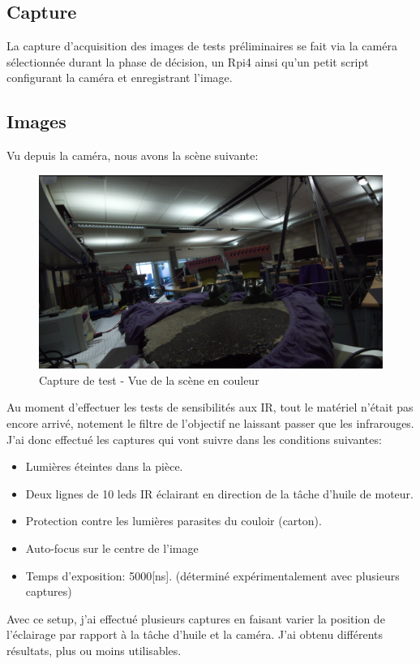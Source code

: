 \subsection{Capture}
La capture d'acquisition des images de tests préliminaires se fait via la caméra sélectionnée durant la phase de décision, un Rpi4 ainsi
qu'un petit script configurant la caméra et enregistrant l'image.
\subsection{Images}
Vu depuis la caméra, nous avons la scène suivante:

\begin{figure}[H]
    \centering
    \includegraphics[width=13cm]{assets/figures/camera_vue_couleur1.png}
    \caption{Capture de test - Vue de la scène en couleur}
\end{figure}

Au moment d'effectuer les tests de sensibilités aux IR, tout le matériel n'était pas encore arrivé, notement le filtre de l'objectif ne
laissant passer que les infrarouges. J'ai donc effectué les captures qui vont suivre dans les conditions suivantes:
\begin{itemize}
    \item Lumières éteintes dans la pièce.
    \item Deux lignes de 10 leds IR éclairant en direction de la tâche d'huile de moteur.
    \item Protection contre les lumières parasites du couloir (carton).
    \item Auto-focus sur le centre de l'image
    \item Temps d'exposition: 5000[ns]. (déterminé expérimentalement avec plusieurs captures)
\end{itemize}
Avec ce setup, j'ai effectué plusieurs captures en faisant varier la position de l'éclairage par rapport à la tâche d'huile et la caméra.
J'ai obtenu différents résultats, plus ou moins utilisables.


